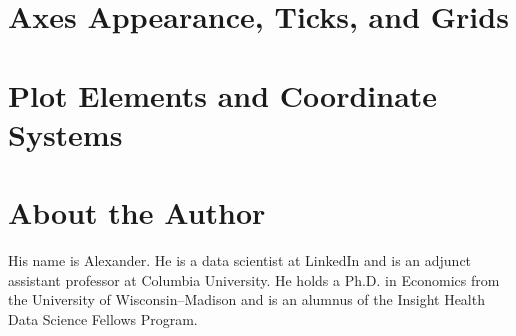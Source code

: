 \documentclass{tex/kdp} %
\begin{document}
\chapter{Axes Appearance, Ticks, and Grids}\label{chapter:axes}


\chapter{Plot Elements and Coordinate Systems}\label{chapter:elements}


\backmatter
\printbibliography
\chapter*{About the Author}
His name is Alexander. He is a data scientist at LinkedIn and is an adjunct assistant professor at Columbia University. He holds a Ph.D. in Economics from the University of Wisconsin–Madison and is an alumnus of the Insight Health Data Science Fellows Program. \faHandPeaceO
\end{document}
